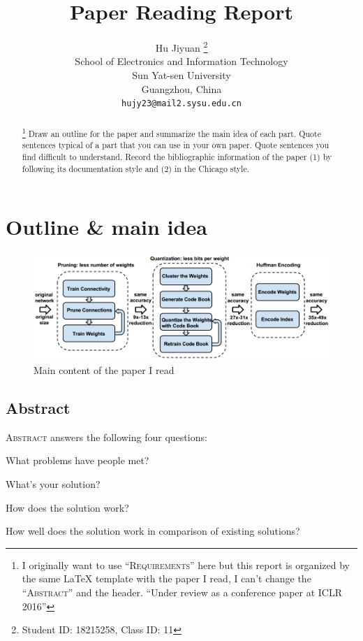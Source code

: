 \documentclass{article} %
\title{Paper Reading Report}
\author{Hu Jiyuan \thanks{ Student ID: 18215258, Class ID: 11} \\
School of Electronics and Information Technology\\
Sun Yat-sen University\\
Guangzhou, China \\
\texttt{hujy23@mail2.sysu.edu.cn} \\
}
\begin{document}
\maketitle

\begin{abstract} 
\footnote{I originally want to use ``\textsc{Requirements}'' here 
but this report is organized by the same \LaTeX{} template with the 
paper I read, I can't change the ``\textsc{Abstract}'' and the header.
``Under review as a conference paper at ICLR 2016''} 
Draw an outline for the paper and summarize the main idea of each part.
Quote sentences typical of a part that you can use in your own paper.
Quote sentences you find difficult to understand.
Record the bibliographic information of the paper 
(1) by following its documentation style and 
(2) in the Chicago style.
\end{abstract}

\section{Outline \& main idea}
\begin{figure}[h]
\label{main}
\begin{center}
\includegraphics[width=\textwidth]{graphics/part1-overview.png} 
\end{center}
\caption{Main content of the paper I read}
\end{figure}

\subsection{Abstract} 

\textsc{Abstract} answers the following four questions: 
    \par What problems have people met?
    \par What's your solution?
    \par How does the solution work?
    \par How well does the solution work in comparison of existing solutions?
\end{document}
